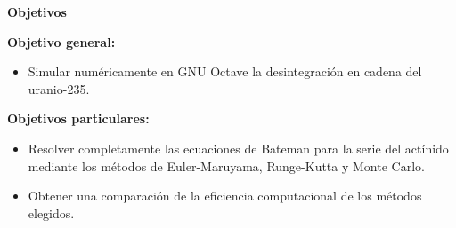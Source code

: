 \begin{center}
    \textbf{Objetivos}
\end{center}\vspace{-0.5cm}

\textbf{Objetivo general:}
\begin{itemize}
    \item Simular numéricamente en GNU Octave la desintegración en cadena
 del uranio-235.
\end{itemize}

\textbf{Objetivos particulares:}
\begin{itemize}
    \item Resolver completamente las ecuaciones de Bateman para la serie
 del actínido mediante los métodos de Euler-Maruyama, Runge-Kutta y Monte Carlo.
    \item Obtener una comparación de la eficiencia computacional de los métodos elegidos.
\end{itemize}